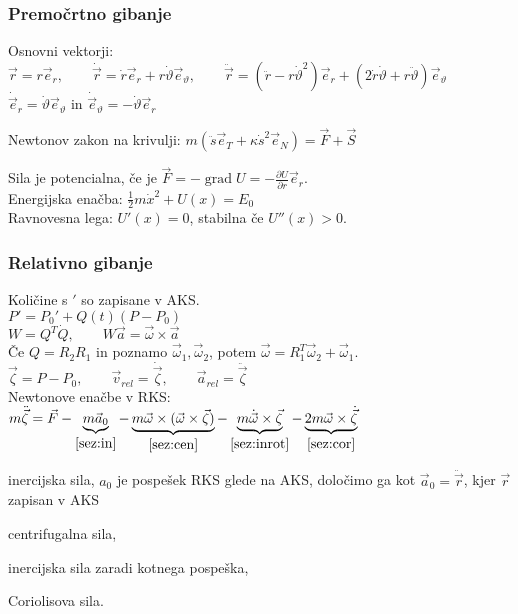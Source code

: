 \documentclass[a4paper,10pt]{article}
\title{\mytitle}
\author{Jure Slak}
\date{\today}
\theoremstyle{definition}
\newenvironment{enumerate*}%
{
\vspace{-6pt}
\begin{enumerate}[(1)]
\setlength{\itemsep}{0pt}
\setlength{\parskip}{2pt}
}
{\end{enumerate}}
\DeclareMathOperator{\grad}{grad}
\let\theta\vartheta
\newcommand{\vzeta}{\vec{\zeta}}
\newcommand{\dzeta}{\dot{\vzeta}}
\newcommand{\ddzeta}{\ddot{\vzeta}}
\newcommand{\vomega}{\vec{\omega}}
\newcommand{\domega}{\dot{\vomega}}
\newcommand{\va}{\vec{a}}
\newcommand{\vr}{\vec{r}}
\newcommand{\dr}{\dot{\vr}}
\newcommand{\ddr}{\ddot{\vr}}
\newcommand{\er}{\vec{e}_r}
\newcommand{\eq}{\vec{e}_{\theta}}
\begin{document}
\subsubsection*{Premočrtno gibanje}
Osnovni vektorji: $\vr = r\er, \qquad \dr = \dot{r}\er + r\dot{\theta}\eq,
\qquad \ddr = (\ddot{r} - r\dot{\theta}^2)\er + (2\dot{r}\dot{\theta} +
r\ddot{\theta})\eq$ \\
$\dot{\vec{e}}_r = \dot{\theta} \eq$ in $\dot{\vec{e}}_{\theta} = - \dot{\theta} \er$

Newtonov zakon na krivulji: $m(\ddot{s}\vec{e}_T + \kappa\dot{s}^2\vec{e}_N)
= \vec{F} + \vec{S}$

Sila je potencialna, če je $\vec{F} = -\grad U = - \frac{\partial U}{\partial
r}\er$. \\
Energijska enačba: $\frac12m\dot{x}^2 + U(x) = E_0$ \\
Ravnovesna lega: $U'(x) = 0$, stabilna če $U''(x) > 0$.

\subsubsection*{Relativno gibanje}
Količine s $'$ so zapisane v AKS. \\
$P' = P_0' + Q(t)(P-P_0)$ \\
$W = Q^T\dot{Q}, \qquad  W\va = \vomega \times \va$ \\
Če $Q=R_2R_1$ in poznamo $\vomega_1,\vomega_2$, potem $\vomega=R_1^T\vomega_2+\vomega_1$.\\
$\vzeta = P - P_0, \qquad \vec{v}_{rel} = \dzeta, \qquad \va_{rel} =
\ddzeta$
\\
Newtonove enačbe v RKS: \\[6pt]
$m\ddzeta = \vec{F} -
\underbrace{m\va_0}_{\eqref{sez:in}} -
\underbrace{m\vomega \times (\vomega \times \vzeta)}_{\eqref{sez:cen}} -
\underbrace{m\domega\times\vzeta}_{\eqref{sez:inrot}} -
\underbrace{2m\vomega\times\dzeta}_{\eqref{sez:cor}}$

\begin{enumerate*}
  \item inercijska sila, $a_0$ je pospešek RKS glede na AKS,  določimo ga kot
      $\vec{a}_0 = \ddot{\vec{r}}$, kjer $\vec{r}$ zapisan v AKS \label{sez:in}
  \item centrifugalna sila,                                   \label{sez:cen}
  \item inercijska sila zaradi kotnega pospeška,              \label{sez:inrot}
  \item Coriolisova sila.                                     \label{sez:cor}
\end{enumerate*}
\end{document}

